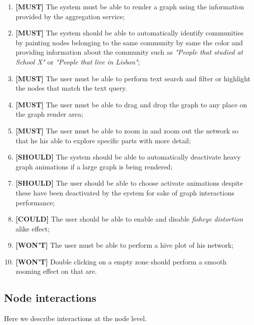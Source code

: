 \begin{enumerate}
    \item \textbf{[MUST]} The system must be able to render a graph using the information provided by the aggregation service;
    \item \textbf{[MUST]} The system should be able to automatically identify communities by painting nodes belonging to the same community by same the color and providing
    information about the community such as \textit{"People that studied at School X"} or \textit{"People that live in Lisbon"};
    \item \textbf{[MUST]} The user must be able to perform text search and filter or highlight the nodes that match the text query.
    \item \textbf{[MUST]} The user must be able to drag and drop the graph to any place on the graph render area;
    \item \textbf{[MUST]} The user must be able to zoom in and zoom out the network so that he his able to explore specific parts with more detail;
    \item \textbf{[SHOULD]} The system should be able to automatically deactivate heavy graph animations if a large graph is being rendered;
    \item \textbf{[SHOULD]} The user should be able to choose activate animations despite these have been deactivated by the system for sake of graph interactions performance;
    \item \textbf{[COULD]} The user should be able to enable and disable \textit{fisheye distortion} alike effect; %
    \item \textbf{[WON'T]} The user must be able to perform a hive plot of his network;
    \item \textbf{[WON'T]} Double clicking on a empty zone should perform a smooth zooming effect on that are. %
\end{enumerate}

\subsection{Node interactions}

Here we describe interactions at the node level.

